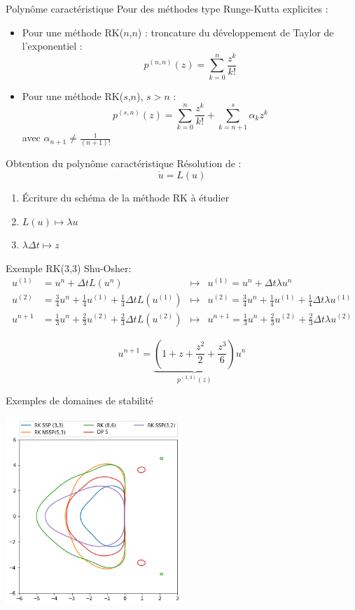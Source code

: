 \documentclass{beamer}
\begin{document}
\begin{frame}{Polynôme caractéristique}
  Pour des méthodes type Runge-Kutta explicites :
  \begin{itemize}
    \item Pour une méthode RK($n$,$n$) : troncature du développement de Taylor de l'exponentiel : $$p^{(n,n)}(z) = \sum_{k=0}^n \frac{z^k}{k!}$$
    \item Pour une méthode RK($s$,$n$), $s>n$ : $$p^{(s,n)}(z) = \sum_{k=0}^n \frac{z^k}{k!} + \sum_{k=n+1}^s \alpha_k z^k$$ avec $\alpha_{n+1} \neq \frac{1}{(n+1)!}$
  \end{itemize}
\end{frame}
\begin{frame}{Obtention du polynôme caractéristique}
  Résolution de : $$\dot{u} = L(u)$$
  \begin{enumerate}
    \item Écriture du schéma de la méthode RK à étudier
    \item $L(u) \mapsto \lambda u$
    \item $\lambda\Delta t \mapsto z$
  \end{enumerate}

  Exemple RK(3,3) Shu-Osher: $$
    \begin{aligned}
      u^{(1)} &= u^n + \Delta t L(u^n)                                                & \mapsto & u^{(1)} = u^n + \Delta t \lambda u^n \\
      u^{(2)} &= \frac{3}{4}u^n + \frac{1}{4}u^{(1)} + \frac{1}{4}\Delta t L(u^{(1)}) & \mapsto & u^{(2)} = \frac{3}{4}u^n + \frac{1}{4}u^{(1)} + \frac{1}{4}\Delta t \lambda u^{(1)} \\
      u^{n+1} &= \frac{1}{3}u^n + \frac{2}{3}u^{(2)} + \frac{2}{3}\Delta t L(u^{(2)}) & \mapsto & u^{n+1} = \frac{1}{3}u^n + \frac{2}{3}u^{(2)} + \frac{2}{3}\Delta t \lambda u^{(2)}
    \end{aligned}
  $$

  $$
    u^{n+1} = \underbrace{\left( 1 + z + \frac{z^2}{2} + \frac{z^3}{6} \right)}_{p^{(3,3)}(z)}u^n
  $$
\end{frame}

\begin{frame}{Exemples de domaines de stabilité}
  \begin{center}
    \includegraphics[width=0.5\textwidth]{rk.png}
  \end{center}
\end{frame}
\end{document}
